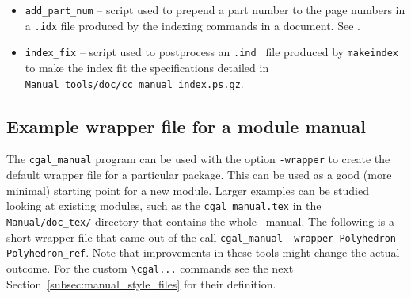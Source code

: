 \begin{itemize}
   \item \verb|add_part_num|%
         -- script used to prepend a part number to the
         page numbers in a {\tt .idx} file produced by the indexing commands in
         a  document.
         See .
   \item \verb|index_fix|%
         -- script used to postprocess an {\tt .ind } file
         produced by {\tt makeindex} to make the index fit the specifications
         detailed in %
         {{\tt Manual\_tools/doc/cc\_manual\_index.ps.gz}}.
\end{itemize}
\ccModifierCrossRefOn

\subsection{Example wrapper file for a module manual}
\label{subsec:wrapper_module_manual}

The \texttt{cgal\_manual} program can be used with the option
\texttt{-wrapper} to create the default wrapper file for a particular
package. This can be used as a good (more minimal) starting point for
a new module. Larger examples can be studied looking at existing
modules, such as the \texttt{cgal\_manual.tex} in the
\texttt{Manual/doc\_tex/} directory that contains the whole \cgal\
manual. The following is a short wrapper file that came out of the
call \texttt{cgal\_manual -wrapper Polyhedron Polyhedron\_ref}. Note
that improvements in these tools might change the actual outcome. For
the custom \verb|\cgal...| commands see the next
Section~\ref{subsec:manual_style_files} for their definition.

